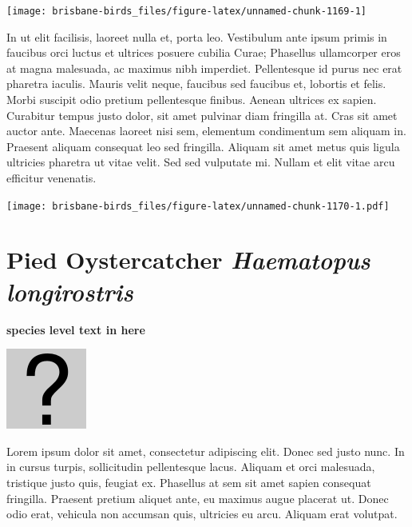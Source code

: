 \documentclass[]{book}
\let\origfigure\figure
\let\endorigfigure\endfigure
\renewenvironment{figure}[1][2] {
  \expandafter\origfigure\expandafter[H]
} {
  \endorigfigure
}
\begin{document}
\begin{figure}
\texttt{[image: brisbane-birds\_files/figure-latex/unnamed-chunk-1169-1]} \caption{insert figure caption}\label{fig:unnamed-chunk-1169}
\end{figure}

In ut elit facilisis, laoreet nulla et, porta leo. Vestibulum ante ipsum
primis in faucibus orci luctus et ultrices posuere cubilia Curae;
Phasellus ullamcorper eros at magna malesuada, ac maximus nibh
imperdiet. Pellentesque id purus nec erat pharetra iaculis. Mauris velit
neque, faucibus sed faucibus et, lobortis et felis. Morbi suscipit odio
pretium pellentesque finibus. Aenean ultrices ex sapien. Curabitur
tempus justo dolor, sit amet pulvinar diam fringilla at. Cras sit amet
auctor ante. Maecenas laoreet nisi sem, elementum condimentum sem
aliquam in. Praesent aliquam consequat leo sed fringilla. Aliquam sit
amet metus quis ligula ultricies pharetra ut vitae velit. Sed sed
vulputate mi. Nullam et elit vitae arcu efficitur venenatis.

\begin{figure}
\centering
\texttt{[image: brisbane-birds\_files/figure-latex/unnamed-chunk-1170-1.pdf]}
\caption{\label{fig:unnamed-chunk-1170}insert figure caption}
\end{figure}

\section{\texorpdfstring{Pied Oystercatcher \emph{Haematopus
longirostris}}{Pied Oystercatcher Haematopus longirostris}}\label{pied-oystercatcher-haematopus-longirostris}

\textbf{species level text in here}

\begin{figure}
\centering
\includegraphics{assets/missing.png}
\caption{No image for species}
\end{figure}

Lorem ipsum dolor sit amet, consectetur adipiscing elit. Donec sed justo
nunc. In in cursus turpis, sollicitudin pellentesque lacus. Aliquam et
orci malesuada, tristique justo quis, feugiat ex. Phasellus at sem sit
amet sapien consequat fringilla. Praesent pretium aliquet ante, eu
maximus augue placerat ut. Donec odio erat, vehicula non accumsan quis,
ultricies eu arcu. Aliquam erat volutpat.
\end{document}
